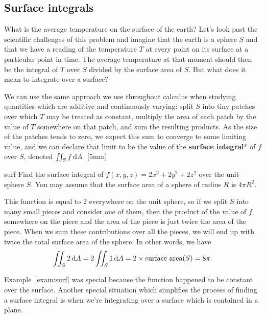 \documentclass[prettycode,shellescape]{watsonbook}
\begin{document}
\subsection{Surface integrals}


What is the average temperature on the surface of the earth? Let's
look past the scientific challenges of this problem and imagine that
the earth is a sphere $S$ and that we have a reading of the
temperature $T$ at every point on its surface at a particular point in
time. The average temperature at that moment should then be the
integral of $T$ over $S$ divided by the surface area of $S$. But what
does it mean to integrate over a surface?

We can use the same approach we use throughout calculus when studying
quantities which are additive and continuously varying: split $S$ into
tiny patches over which $T$ may be treated as constant, multiply the
area of each patch by the value of $T$ somewhere on that patch, and
sum the resulting products. As the size of the patches tends to zero,
we expect this sum to converge to some limiting value, and we can
declare that limit to be the value of the \textbf{surface integral}*
of $f$ over $S$, denoted $\iint_S f \, {\mathrm{d}}A$. [5mm]

\begin{example}{}{surf}
  Find the surface integral of $f(x,y,z) = 2x^2 +2y^2 + 2z^2$ over the
  unit sphere $S$. You may assume that the surface area of a sphere of
  radius $R$ is $4\pi R^2$. 
\end{example}

\begin{solution}
  This function is equal to 2 everywhere on the unit sphere, so if we
  split $S$ into many small pieces and consider one of them, then the
  product of the value of $f$ somewhere on the piece and the area of
  the piece is just twice the area of the piece. When we sum these
  contributions over all the pieces, we will end up with twice the
  total surface area of the sphere. In other words, we have
  \[
    \iint_{S} 2 \,\mathrm{d} A =     2 \iint_{S} 1 \,\mathrm{d} A = 2 \times \text{surface
      area}(S) = 8\pi. 
  \]
\end{solution}

Example~\ref{exam:surf} was special because the function happened to
be constant over the surface. Another special situation which
simplifies the process of finding a surface integral is when
we're integrating over a surface which is contained in a plane. 
\end{document}
